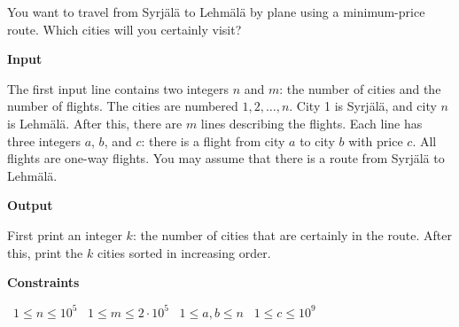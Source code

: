You want to travel from Syrjälä to Lehmälä by plane using a minimum-price route. Which cities will you certainly visit?

\vspace{0.3cm}\noindent\textbf{Input}

The first input line contains two integers $n$ and $m$: the number of cities and the number of flights. The cities are numbered $1,2,\ldots,n$. City 1 is Syrjälä, and city $n$ is Lehmälä.
After this, there are $m$ lines describing the flights. Each line has three integers $a$, $b$, and $c$: there is a flight from city $a$ to city $b$ with price $c$. All flights are one-way flights.
You may assume that there is a route from Syrjälä to Lehmälä.

\vspace{0.3cm}\noindent\textbf{Output}

First print an integer $k$: the number of cities that are certainly in the route. After this, print the $k$ cities sorted in increasing order.

\vspace{0.3cm}\noindent\textbf{Constraints}

\textbullet\ $1 \le n \le 10^5$
\textbullet\ $1 \le m \le 2 \cdot 10^5$
\textbullet\ $1 \le a,b \le n$
\textbullet\ $1 \le c \le 10^9$